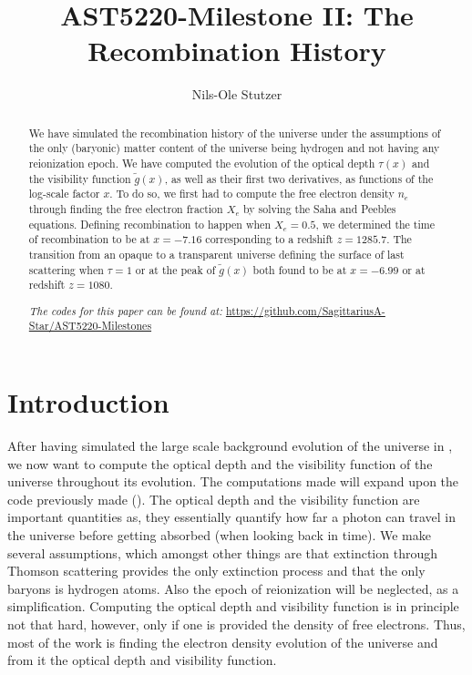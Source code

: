 \documentclass[twocolumn]{aastex62}
\begin{document}
\title{\Large AST5220-Milestone II: The Recombination History}

\author{Nils-Ole Stutzer}

\begin{abstract}
    We have simulated the recombination history of the universe under the assumptions of the only (baryonic) matter content of the universe being hydrogen and not having any reionization epoch. We have computed the evolution of the optical depth $\tau(x)$ and the visibility function $\tilde{g}(x)$, as well as their first two derivatives, as functions of the log-scale factor $x$. To do so, we first had to compute the free electron density $n_e$ through finding the free electron fraction $X_e$ by solving the Saha and Peebles equations. Defining recombination to happen when $X_e = 0.5$, we determined the time of recombination to be at $x = -7.16$ corresponding to a redshift $z = 1285.7$. The transition from an opaque to a transparent universe defining the surface of last scattering when $\tau = 1$ or at the peak of $\tilde{g}(x)$ both found to be at $x = -6.99$ or at redshift $z = 1080$.

    \textit{The codes for this paper can be found at:} \newline \url{https://github.com/SagittariusA-Star/AST5220-Milestones}
\end{abstract}

\section{Introduction} \label{sec:Intro}
After having simulated the large scale background evolution of the universe in \cite{stutzer:2020}, we now want to compute the optical depth and the visibility function of the universe throughout its evolution. The computations made will expand upon the code previously made (\cite{stutzer:2020}). The optical depth and the visibility function are important quantities as, they essentially quantify how far a photon can travel in the universe before getting absorbed (when looking back in time). We make several assumptions, which amongst other things are that extinction through Thomson scattering provides the only extinction process and that the only baryons is hydrogen atoms. Also the epoch of reionization will be neglected, as a simplification. Computing the optical depth and visibility function is in principle not that hard, however, only if one is provided the density of free electrons. Thus, most of the work is finding the electron density evolution of the universe and from it the optical depth and visibility function. 
\end{document}
